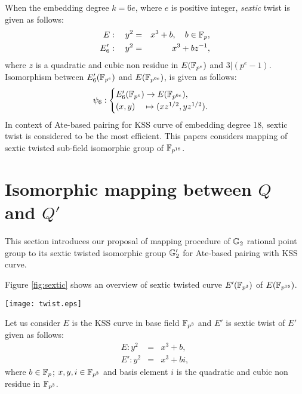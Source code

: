         When the embedding degree $k = 6e$, where $e$ is positive integer, \textit{sextic} twist is given as follows:
        \begin{eqnarray}
        E:  \quad y^2 & = & x^3+b, \quad b \in {\mathbb{F}}_{p}, \\
        E'_6: \quad y^2 & =  & x^3+bz^{-1},
        \end{eqnarray}  
        where $z$ is a quadratic and cubic non residue in $E({\mathbb{F}}_{p^{e}})$ and $3|(p^e-1)$.  Isomorphism between $E'_6({\mathbb{F}}_{p^{e}})$ and $E({\mathbb{F}}_{p^{6e}})$, is given as follows:
        \begin{eqnarray}
        \psi_6 : \begin{cases}
        E'_6({\mathbb{F}}_{p^{e}}) \rightarrow E({\mathbb{F}}_{p^{6e}}),\\
        (x,y) \quad \mapsto (xz^{1/2},yz^{1/2}).
        \end{cases}
        \end{eqnarray}
        In context of Ate-based pairing for KSS curve of embedding degree 18, sextic twist is considered to be the most efficient. This papers considers mapping of sextic twisted sub-field isomorphic group of $\mathbb{F}_{p^{18}}$. 
        
        \section{Isomorphic mapping between $Q$ and $Q'$}
        This section introduces our proposal of mapping procedure of ${\mathbb{G}}_{2}$ rational point group to its sextic twisted isomorphic group ${\mathbb{G}}_{2}'$ for Ate-based pairing with KSS curve. 
        
        Figure \ref{fig:sextic} shows an overview of sextic twisted curve $E'(\mathbb{F}_{p^3})$ of $E(\mathbb{F}_{p^{18}})$.
        \begin{figure*}
        \centering
        \texttt{[image: twist.eps]}
        \caption{\textit{sextic twist} in KSS curve.}
        \label{fig:sextic}
        \end{figure*}
        Let us consider $E$ is the KSS curve in base field $\mathbb{F}_{p^3}$  and $E'$ is sextic twist of $E'$ given as follows: 
        \begin{eqnarray}
        E:y^2 & = &x^3+b,\\
        E':y^2 & = & x^3+bi, \label{eq:KSS_Twist}
        \end{eqnarray}
        where $b \in {\mathbb{F}}_{p}$; $x, y, i \in \mathbb{F}_{p^3}$ and basis element $i$ is the quadratic and cubic non residue in $\mathbb{F}_{p^3}$.
        
